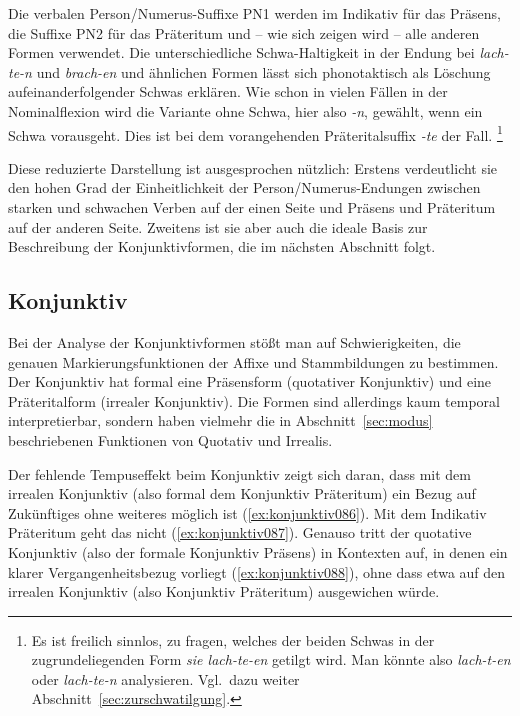 Die verbalen Person\slash Numerus-Suffixe PN1 werden im Indikativ für das Präsens, die Suffixe PN2 für das Präteritum und -- wie sich zeigen wird -- alle anderen Formen verwendet.
Die unterschiedliche Schwa-Hal\-tig\-keit in der Endung bei \textit{lach-te-n} und \textit{brach-en} und ähnlichen Formen lässt sich phonotaktisch als Löschung aufeinanderfolgender Schwas erklären.
Wie schon in vielen Fällen in der Nominalflexion wird die Variante ohne Schwa, hier also \textit{-n}, gewählt, wenn ein Schwa vorausgeht.
Dies ist bei dem vorangehenden Präteritalsuffix \textit{-te} der Fall.%
\footnote{Es ist freilich sinnlos, zu fragen, welches der beiden Schwas in der zugrundeliegenden Form \textit{sie lach-te-en} getilgt wird.
Man könnte also \textit{lach-t-en} oder \textit{lach-te-n} analysieren.
Vgl.\ dazu weiter Abschnitt~\ref{sec:zurschwatilgung}.}

Diese reduzierte Darstellung ist ausgesprochen nützlich:
Erstens verdeutlicht sie den hohen Grad der Einheitlichkeit der Person\slash Numerus-Endungen zwischen starken und schwachen Verben auf der einen Seite und Präsens und Präteritum auf der anderen Seite.
Zweitens ist sie aber auch die ideale Basis zur Beschreibung der Konjunktivformen, die im nächsten Abschnitt folgt.

\subsection{Konjunktiv}
\label{sec:konjunktiv}


Bei der Analyse der Konjunktivformen stößt man auf Schwierigkeiten, die genauen Markierungsfunktionen der Affixe und Stammbildungen zu bestimmen.
Der Konjunktiv hat formal eine Präsensform (quotativer Konjunktiv) und eine Präteritalform (irrealer Konjunktiv).
Die Formen sind allerdings kaum temporal interpretierbar, sondern haben vielmehr die in Abschnitt~\ref{sec:modus} beschriebenen Funktionen von Quotativ und Irrealis.

Der fehlende Tempuseffekt beim Konjunktiv zeigt sich \zB daran, dass mit dem irrealen Konjunktiv (also formal dem Konjunktiv Präteritum) ein Bezug auf Zukünftiges ohne weiteres möglich ist (\ref{ex:konjunktiv086}).
Mit dem Indikativ Präteritum geht das nicht (\ref{ex:konjunktiv087}).
Genauso tritt der quotative Konjunktiv (also der formale Konjunktiv Präsens) in Kontexten auf, in denen ein klarer Vergangenheitsbezug vorliegt (\ref{ex:konjunktiv088}), ohne dass etwa auf den irrealen Konjunktiv (also Konjunktiv Präteritum) ausgewichen würde.

